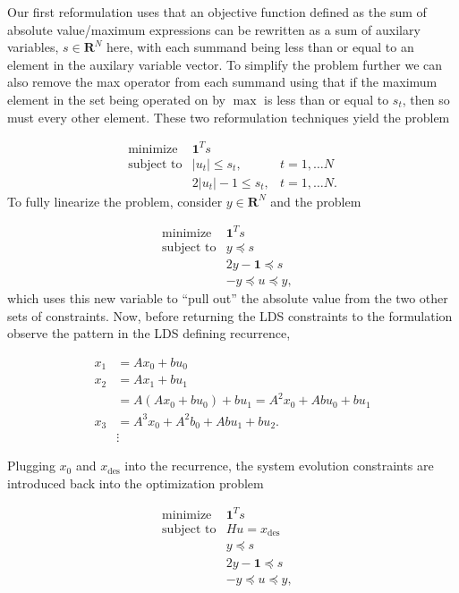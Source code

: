 \documentclass[12pt,reqno]{article}
\theoremstyle{definition}
\numberwithin{equation}{section}
\begin{document}
   Our first reformulation uses that an objective function defined as the sum of absolute value/maximum expressions can be rewritten
   as a sum of auxilary variables, $s \in \mathbf{R}^N$ here, with each summand being less than
   or equal to an element in the auxilary variable vector. To simplify the problem further we can also 
   remove the max operator from each summand using that if the maximum element in the set
   being operated on by $\max$ is less than or equal to $s_t$, then so must every other element.
   These two reformulation techniques yield the problem

   \[\begin{array}{lll}
   \text{minimize} \; & \bm{1}^T s & \\
   \text{subject to} & \left| u_t \right| \le s_t, & t = 1, \ldots N \\
   & 2 \left| u_t \right| - 1 \le s_t, & t = 1, \ldots N.
   \end{array}\]
   To fully linearize the problem, consider $y \in \mathbf{R}^N$ and the problem

   \[\begin{array}{lll}
   \text{minimize} \; & \bm{1}^T s & \\
   \text{subject to} & y \preceq s & \\
   & 2y - \bm{1} \preceq s \\
   & -y \preceq u \preceq y, & 
   \end{array}\]
   which uses this new variable to ``pull out'' the absolute value from the two other sets
   of constraints.
   Now, before returning the LDS constraints to the formulation observe the pattern in the LDS defining recurrence,

   \[\begin{aligned}
    x_1 &= Ax_0 + bu_0 \\
    x_2 &= Ax_1 + bu_1 \\
    &= A(Ax_0 + bu_0)+ bu_1 = A^2x_0 + Abu_0 + bu_1 \\
    x_3 &= A^3x_0 + A^2b_0 + Abu_1 + bu_2. \\
    &\vdots
    \end{aligned}\]

    Plugging $x_0$ and $x_{\mathrm{des}}$ into the recurrence, the system evolution constraints
    are introduced back into the optimization problem
    
    \[\begin{array}{lll}
        \text{minimize} \; & \bm{1}^T s & \\
        \text{subject to} & Hu = x_{\mathrm{des}} \; &\\
        & y \preceq s & \\
        & 2y - \bm{1} \preceq s & \\
        & -y \preceq u \preceq y, & 
        \end{array}\]
\end{document}
